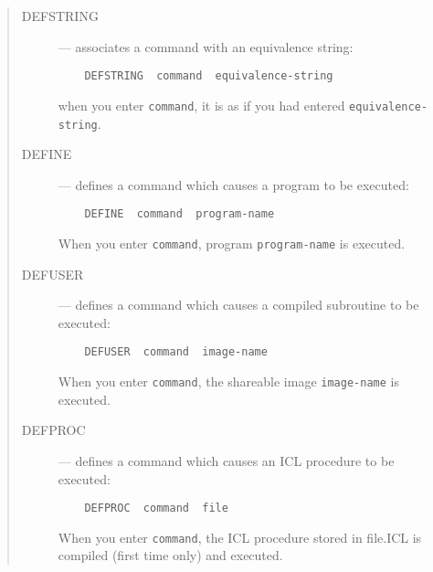 \begin{quote}
\begin{description}

\item [DEFSTRING] --- associates a command with an equivalence string:

\begin{small}
\begin{verbatim}
    DEFSTRING  command  equivalence-string
\end{verbatim}
\end{small}

when you enter {\small\tt command}, it is as if you had entered
{\small\tt equivalence-string}.

\item [DEFINE] --- defines a command which causes a program to be executed:

\begin{small}
\begin{verbatim}
    DEFINE  command  program-name
\end{verbatim}
\end{small}

When you enter {\small\tt command}, program {\small\tt program-name} is
executed.

\item [DEFUSER] --- defines a command which causes a compiled subroutine to
be executed:

\begin{small}
\begin{verbatim}
    DEFUSER  command  image-name
\end{verbatim}
\end{small}

When you enter {\small\tt command}, the shareable image {\small\tt image-name} 
is executed.

\item [DEFPROC] --- defines a command which causes an ICL procedure to be
executed:

\begin{small}
\begin{verbatim}
    DEFPROC  command  file
\end{verbatim}
\end{small}

When you enter {\small\tt command}, the ICL procedure stored in file.ICL is
compiled (first time only) and executed.

\end{description}
\end{quote}

